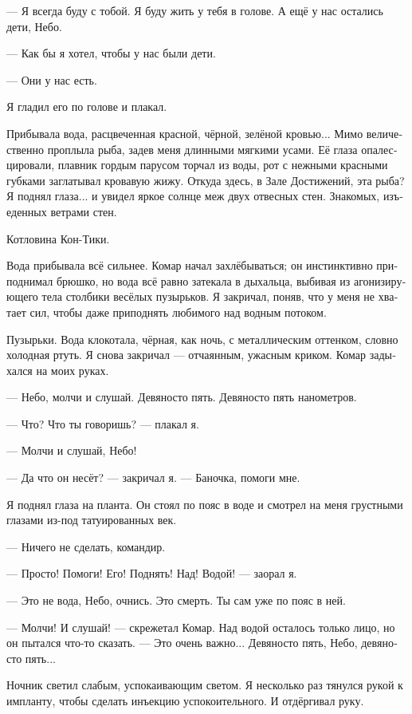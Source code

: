 \documentclass[a4paper,12pt,fleqn]{book}\usepackage{polyglossia}\setdefaultlanguage[babelshorthands=true]{russian}\setotherlanguage{english}\defaultfontfeatures{Ligatures=TeX,Mapping=tex-text}\usepackage{xcolor}\newcommand{\ml}[3]{#2}
\newcommand{\asterism}{\vspace{1em}{\centering\Large\bfseries$\ast~\ast~\ast$\par}\vspace{1em}}
\begin{document}
{--- Я всегда буду с тобой.
Я буду жить у тебя в голове.
А ещё у нас остались дети, Небо.

--- Как бы я хотел, чтобы у нас были дети.

--- Они у нас есть.

Я гладил его по голове и плакал.

Прибывала вода, расцвеченная красной, чёрной, зелёной кровью...
Мимо величественно проплыла рыба, задев меня длинными мягкими усами.
Её глаза опалесцировали, плавник гордым парусом торчал из воды, рот с нежными красными губками заглатывал кровавую жижу.
Откуда здесь, в Зале Достижений, эта рыба?
Я поднял глаза... и увидел яркое солнце меж двух отвесных стен.
Знакомых, изъеденных ветрами стен.

Котловина Кон-Тики.

Вода прибывала всё сильнее.
Комар начал захлёбываться;
он инстинктивно приподнимал брюшко, но вода всё равно затекала в дыхальца, выбивая из агонизирующего тела столбики весёлых пузырьков.
Я закричал, поняв, что у меня не хватает сил, чтобы даже приподнять любимого над водным потоком.

Пузырьки.
Вода клокотала, чёрная, как ночь, с металлическим оттенком, словно холодная ртуть.
Я снова закричал --- отчаянным, ужасным криком.
Комар задыхался на моих руках.

--- Небо, молчи и слушай.
Девяносто пять.
Девяносто пять нанометров.

--- Что?
Что ты говоришь? --- плакал я.

--- Молчи и слушай, Небо!

--- Да что он несёт? --- закричал я.
--- Баночка, помоги мне.

Я поднял глаза на планта.
Он стоял по пояс в воде и смотрел на меня грустными глазами из-под татуированных век.

--- Ничего не сделать, командир.

--- Просто! Помоги! Его! Поднять! Над! Водой! --- заорал я.

--- Это не вода, Небо, очнись.
Это смерть.
Ты сам уже по пояс в ней.

--- Молчи! И слушай! --- скрежетал Комар.
Над водой осталось только лицо, но он пытался что-то сказать.
--- Это очень важно...
Девяносто пять, Небо, девяносто пять...

\asterism

Ночник светил слабым, успокаивающим светом.
Я несколько раз тянулся рукой к импланту, чтобы сделать инъекцию успокоительного.
И отдёргивал руку.

}
\end{document}
